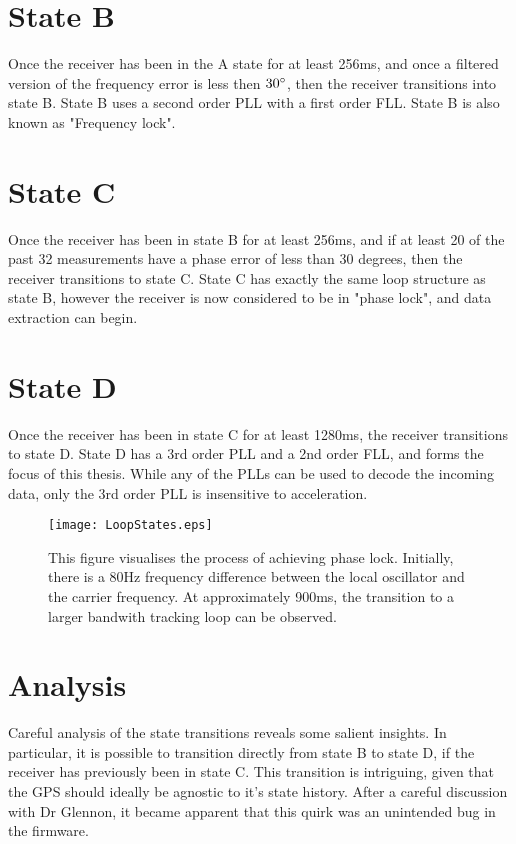 \section{State B}
Once the receiver has been in the A state for at least 256ms, and once a filtered version of the frequency error is less then $30 \degree$, then the receiver transitions into state B. State B uses a second order PLL with a first order FLL. State B is also known as "Frequency lock".


\section{State C}
Once the receiver has been in state B for at least 256ms, and if at least 20 of the past 32 measurements have a phase error of less than 30 degrees, then the receiver transitions to state C. State C has exactly the same loop structure as state B, however the receiver is now considered to be in "phase lock", and data extraction can begin.

\section{State D}
Once the receiver has been in state C for at least 1280ms, the receiver transitions to state D. State D has a 3rd order PLL and a 2nd order FLL, and forms the focus of this thesis. While any of the PLLs can be used to decode the incoming data, only the 3rd order PLL is insensitive to acceleration.  

\begin{figure}[!htb] 
    \centering
    \texttt{[image: LoopStates.eps]} 
    \caption{This figure visualises the process of achieving phase lock. Initially, there is a 80Hz frequency difference between the local oscillator and the carrier frequency. At approximately 900ms, the transition to a larger bandwith tracking loop can be observed. }
    \label{fig:LoopStatesGraph}
\end{figure}


\section{Analysis}
Careful analysis of the state transitions reveals some salient insights. In particular, it is possible to transition directly from state B to state D, if the receiver has previously been in state C. This transition is intriguing, given that the GPS should ideally be agnostic to it's state history. After a careful discussion with Dr Glennon, it became apparent that this quirk was an unintended bug in the firmware.

